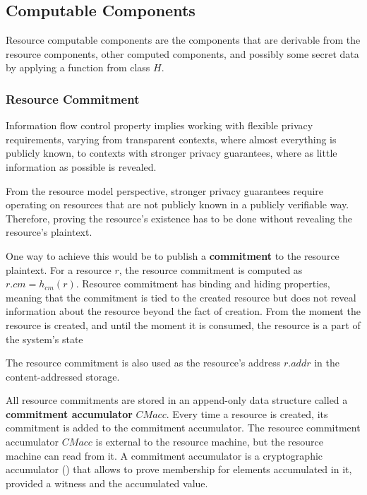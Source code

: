 \documentclass[
    11pt,            %
    techreport,        %
    affiltop,       %
]{art}
\begin{document}
\subsection{Computable Components}

Resource computable components are the components that are derivable from the resource components, other computed components, and possibly some secret data by applying a function from class $H$.

\subsubsection{Resource Commitment}

Information flow control property implies working with flexible privacy requirements, varying from transparent contexts, where almost everything is publicly known, to contexts with stronger privacy guarantees, where as little information as possible is revealed.

From the resource model perspective, stronger privacy guarantees require operating on resources that are not publicly known in a publicly verifiable way. Therefore, proving the resource's existence has to be done without revealing the resource's plaintext.

One way to achieve this would be to publish a \textbf{commitment} to the resource plaintext. For a resource $r$, the resource commitment is computed as $r.cm = h_{cm}(r)$. Resource commitment has binding and hiding properties, meaning that the commitment is tied to the created resource but does not reveal information about the resource beyond the fact of creation. From the moment the resource is created, and until the moment it is consumed, the resource is a part of the system's state

\begin{remark}
    The resource commitment is also used as the resource's address $r.addr$ in the content-addressed storage.
\end{remark}

All resource commitments are stored in an append-only data structure called a \textbf{commitment accumulator} $CMacc$. Every time a resource is created, its commitment is added to the commitment accumulator. The resource commitment accumulator $CMacc$ is external to the resource machine, but the resource machine can read from it. A commitment accumulator is a cryptographic accumulator (\cite{DBLP:journals/corr/abs-2103-04330}) that allows to prove membership for elements accumulated in it, provided a witness and the accumulated value.
\end{document}
